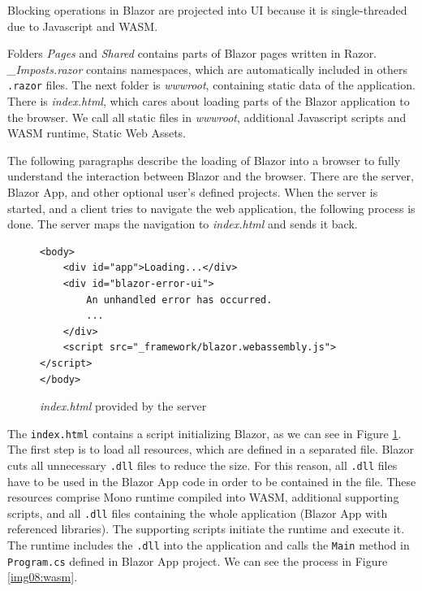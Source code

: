 Blocking operations in Blazor are projected into UI because it is single-threaded due to Javascript and WASM.
\par
Folders \textit{Pages} and \textit{Shared} contains parts of Blazor pages written in Razor.
\textit{\_Imposts.razor} contains namespaces, which are automatically included in others \texttt{.razor} files.
The next folder is \textit{wwwroot}, containing static data of the application.
There is \textit{index.html}, which cares about loading parts of the Blazor application to the browser.
We call all static files in \textit{wwwroot}, additional Javascript scripts and WASM runtime, Static Web Assets.
\par
The following paragraphs describe the loading of Blazor into a browser to fully understand the interaction between Blazor and the browser.
There are the server, Blazor App, and other optional user's defined projects. 
When the server is started, and a client tries to navigate the web application, the following process is done.
The server maps the navigation to \textit{index.html} and sends it back.
\par
\begin{figure}[b!]
\begin{lstlisting}
<body>
    <div id="app">Loading...</div>
    <div id="blazor-error-ui">
        An unhandled error has occurred.
		...
    </div>
    <script src="_framework/blazor.webassembly.js"></script>
</body>

\end{lstlisting}
\caption{\textit{index.html} provided by the server}
\label{img07:index}
\end{figure}
\par 
The \texttt{index.html} contains a script initializing Blazor, as we can see in Figure \ref{img07:index}.
The first step is to load all resources, which are defined in a separated file.
Blazor cuts all unnecessary \texttt{.dll} files to reduce the size.
For this reason, all \texttt{.dll} files have to be used in the Blazor App code in order to be contained in the file. 
These resources comprise Mono runtime compiled into WASM, additional supporting scripts, and all \texttt{.dll} files containing the whole application (Blazor App with referenced libraries).
The supporting scripts initiate the runtime and execute it.
The runtime includes the \texttt{.dll} into the application and calls the \texttt{Main} method in \texttt{Program.cs} defined in Blazor App project.
We can see the process in Figure \ref{img08:wasm}.
\par
